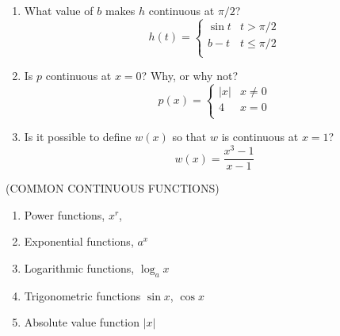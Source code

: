 \documentclass[11pt]{article}
\begin{document}
\begin{enumerate}
\item{What value of $b$ makes $h$ continuous at $\pi/2$?
      \begin{displaymath}
h(t) =   \left\{ \begin{array}{ll}
 \sin{t} & t > \pi/2 \\
b-t & t \leq \pi/2 \\
\end{array} \right.
  \end{displaymath}

}

  \vspace{1in}

  \item{  Is $p$ continuous at $x=0$?  Why, or why not?
  \begin{displaymath}
p(x) =   \left\{ \begin{array}{ll}
 |x| & x \neq 0 \\
4 & x = 0\\
\end{array} \right.
  \end{displaymath}
}

    \vspace{1in}
    
  \item{Is it possible to define $w(x)$ so that $w$ is continuous at $x=1$?
  \begin{displaymath}
w(x) = \frac{x^3-1}{x-1}
  \end{displaymath}

  }

    \vspace{1in}
    
\end{enumerate}



(COMMON CONTINUOUS FUNCTIONS) \\
\vspace{0.2in}

\begin{enumerate}
\item{Power functions, $x^r$, }
  \vspace{0.1in}
\item{Exponential functions, $a^x$}
    \vspace{0.1in}
  \item{Logarithmic functions, $\log_a{x}$}
      \vspace{0.1in}
    \item{Trigonometric functions $\sin{x}$, $\cos{x}$}
        \vspace{0.1in}
\item{Absolute value function $|x|$}
        \vspace{0.1in}
  
  \end{enumerate}
    
\end{document}
